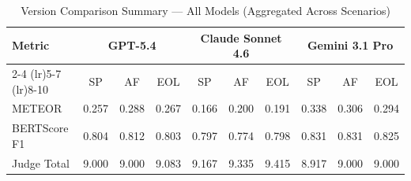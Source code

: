 \begin{table}[htbp]
\centering
\caption{Version Comparison Summary — All Models (Aggregated Across Scenarios)}
\label{tab:version_summary_combined}
\small
\begin{tabular}{lccccccccc}
\toprule
Metric & \multicolumn{3}{c}{GPT-5.4} & \multicolumn{3}{c}{Claude Sonnet 4.6} & \multicolumn{3}{c}{Gemini 3.1 Pro} \\
\cmidrule(lr){2-4} \cmidrule(lr){5-7} \cmidrule(lr){8-10}
 & SP & AF & EOL & SP & AF & EOL & SP & AF & EOL \\
\midrule
METEOR & 0.257 & 0.288 & 0.267 & 0.166 & 0.200 & 0.191 & 0.338 & 0.306 & 0.294 \\
BERTScore F1 & 0.804 & 0.812 & 0.803 & 0.797 & 0.774 & 0.798 & 0.831 & 0.831 & 0.825 \\
Judge Total & 9.000 & 9.000 & 9.083 & 9.167 & 9.335 & 9.415 & 8.917 & 9.000 & 9.000 \\
\bottomrule
\end{tabular}
\end{table}